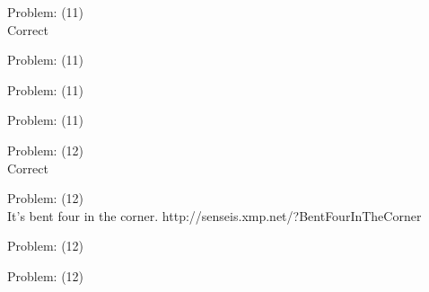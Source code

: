 \documentclass[11pt]{article}
\begin{document}
\begin{minipage}[t]{0.5\textwidth}
  {\centering
  
  Problem: (11)\\
  Correct\\
  }
\end{minipage}
\begin{minipage}[t]{0.5\textwidth}
  {\centering
  
  Problem: (11)\\
  
  }
\end{minipage}
\begin{minipage}[t]{0.5\textwidth}
  {\centering
  
  Problem: (11)\\
  
  }
\end{minipage}
\begin{minipage}[t]{0.5\textwidth}
  {\centering
  
  Problem: (11)\\
  
  }
\end{minipage}
\begin{minipage}[t]{0.5\textwidth}
  {\centering
  
  Problem: (12)\\
  Correct\\
  }
\end{minipage}
\begin{minipage}[t]{0.5\textwidth}
  {\centering
  
  Problem: (12)\\
  It's bent four in the corner. http://senseis.xmp.net/?BentFourInTheCorner\\
  }
\end{minipage}
\begin{minipage}[t]{0.5\textwidth}
  {\centering
  
  Problem: (12)\\
  
  }
\end{minipage}
\begin{minipage}[t]{0.5\textwidth}
  {\centering
  
  Problem: (12)\\
  
  }
\end{minipage}
\end{document}
